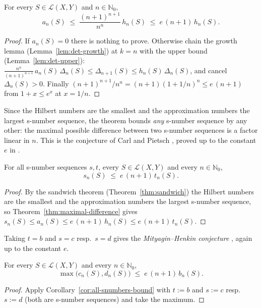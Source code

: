\begin{theorem}
\label{thm:maximal-difference}
\leanok
{}
For every $S \in \mathcal{L}(X, Y)$ and $n \in \mathbb{N}_0$,
\[
  a_n(S) \;\le\; \frac{(n+1)^{n+1}}{n^n}\, h_n(S)
  \;\le\; e\,(n+1)\, h_n(S).
\]
\end{theorem}
\begin{proof}
\leanok
{}
If $a_n(S) = 0$ there is nothing to prove. Otherwise chain the growth lemma
(Lemma~\ref{lem:det-growth}) at $k = n$ with the upper bound
(Lemma~\ref{lem:det-upper}):
$\frac{n^n}{(n+1)^{n+1}}\, a_n(S)\, \Delta_n(S) \le \Delta_{n+1}(S) \le
h_n(S)\, \Delta_n(S)$, and cancel $\Delta_n(S) > 0$. Finally
$(n+1)^{n+1}/n^n = (n+1)(1 + 1/n)^n \le e\,(n+1)$ from $1 + x \le e^x$ at
$x = 1/n$.
\end{proof}

Since the Hilbert numbers are the smallest and the approximation numbers the
largest s-number sequence, the theorem bounds \emph{any} s-number sequence
by any other: the maximal possible difference between two s-number sequences
is a factor linear in $n$. This is the conjecture of Carl and Pietsch
\cite{CP78}, proved up to the constant $e$ in \cite{U26}.

\begin{corollary}
\label{cor:all-snumbers-bound}
\leanok
For all s-number sequences $s, t$, every $S \in \mathcal{L}(X, Y)$ and every
$n \in \mathbb{N}_0$,
\[
  s_n(S) \;\le\; e\,(n+1)\, t_n(S) .
\]
\end{corollary}
\begin{proof}
\leanok
{}
By the sandwich theorem (Theorem~\ref{thm:sandwich}) the Hilbert numbers are
the smallest and the approximation numbers the largest s-number sequence, so
Theorem~\ref{thm:maximal-difference} gives
$s_n(S) \le a_n(S) \le e\,(n+1)\, h_n(S) \le e\,(n+1)\, t_n(S)$.
\end{proof}

Taking $t = b$ and $s = c$ resp.\ $s = d$ gives the \emph{Mityagin--Henkin
conjecture} \cite{MH}, again up to the constant $e$.

\begin{corollary}
\label{cor:mityagin-henkin}
\leanok
{}
For every $S \in \mathcal{L}(X, Y)$ and every $n \in \mathbb{N}_0$,
\[
  \max\bigl(c_n(S), d_n(S)\bigr) \;\le\; e\,(n+1)\, b_n(S) .
\]
\end{corollary}
\begin{proof}
\leanok
{}
Apply Corollary~\ref{cor:all-snumbers-bound} with $t := b$ and $s := c$ resp.\
$s := d$ (both are s-number sequences) and take the maximum.
\end{proof}

